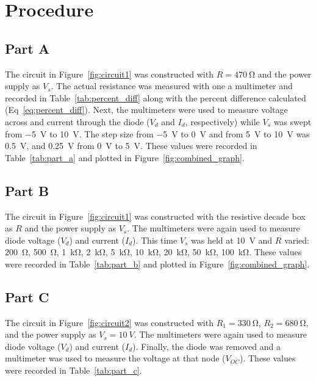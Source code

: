 \documentclass{article}
\begin{document}
\section{Procedure}
\label{sec:procedure}

\subsection{Part A}
\label{sec:proc_a}

The circuit in Figure~\ref{fig:circuit1} was constructed with $R =
\SI{470}{\ohm}$ and the power supply as $V_s$.  The actual resistance
was measured with one a multimeter and recorded in
Table~\ref{tab:percent_diff} along with the percent difference calculated
(Eq~\ref{eq:percent_diff}).  Next, the multimeters were used to
measure voltage across and current through the diode ($V_d$ and $I_d$,
respectively) while $V_s$ was swept from \SI{-5}{V} to \SI{+10}{V}.
The step size from \SI{-5}{V} to \SI{0}{V} and from \SI{5}{V} to
\SI{10}{V} was \SI{0.5}{V}, and \SI{0.25}{V} from \SI{0}{V} to
\SI{5}{V}.  These values were recorded in Table~\ref{tab:part_a} and
plotted in Figure~\ref{fig:combined_graph}.

\subsection{Part B}
\label{sec:proc_b}

The circuit in Figure~\ref{fig:circuit1} was constructed with the
resistive decade box as $R$ and the power supply as $V_s$.  The
multimeters were again used to measure diode voltage ($V_d$) and
current ($I_d$).  This time $V_s$ was held at \SI{10}{V} and $R$
varied: \SI{200}{\ohm}, \SI{500}{\ohm}, \SI{1}{\kilo\ohm},
\SI{2}{\kilo\ohm}, \SI{5}{\kilo\ohm}, \SI{10}{\kilo\ohm},
\SI{20}{\kilo\ohm}, \SI{50}{\kilo\ohm}, \SI{100}{\kilo\ohm}.  These
values were recorded in Table~\ref{tab:part_b} and plotted in
Figure~\ref{fig:combined_graph}.

\subsection{Part C}
\label{sec:proc_c}

The circuit in Figure~\ref{fig:circuit2} was constructed with $R_1 =
\SI{330}{\ohm}$, $R_2 = \SI{680}{\ohm}$, and the power supply as $V_s
= \SI{10}{V}$.  The multimeters were again used to measure diode
voltage ($V_d$) and current ($I_d$).  Finally, the diode was removed
and a multimeter was used to measure the voltage at that node
($V_{OC}$).  These values were recorded in Table~\ref{tab:part_c}.
\end{document}
